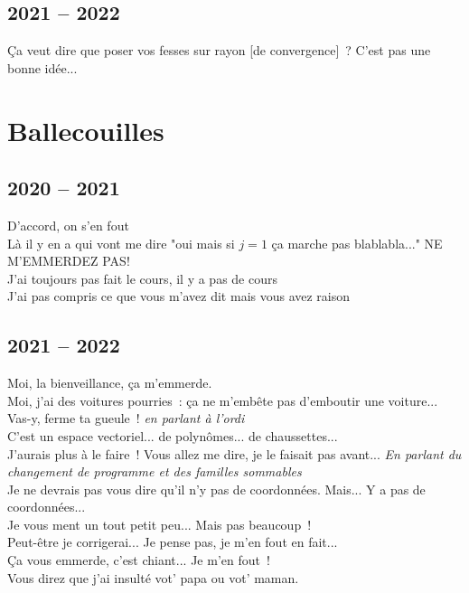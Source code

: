 \documentclass[french, a4paper, openany]{book}
\begin{document}
	\subsection*{2021 -- 2022}
		\noindent \og Ça veut dire que poser vos fesses sur rayon [de convergence]~? C'est pas une bonne idée... \fg \\
 
\section*{Ballecouilles}

	\subsection*{2020 -- 2021}
 
		\noindent \og D'accord, on s'en fout \fg \\
		\og Là il y en a qui vont me dire "oui mais si $j = 1$ ça marche pas blablabla..." NE M'EMMERDEZ PAS! \fg \\
		\og J'ai toujours pas fait le cours, il y a pas de cours \fg \\
		\og J'ai pas compris ce que vous m'avez dit mais vous avez raison \fg \\

	\subsection*{2021 -- 2022}
		\noindent \og Moi, la bienveillance, ça m'emmerde. \fg \\
		\og Moi, j'ai des voitures pourries~: ça ne m'embête pas d'emboutir une voiture... \fg \\
		\og Vas-y, ferme ta gueule~! \fg \emph{en parlant à l'ordi} \\
		\og C'est un espace vectoriel... de polynômes... de chaussettes... \fg \\
		\og J'aurais plus à le faire~! Vous allez me dire, je le faisait pas avant... \fg \emph{En parlant du changement de programme et des familles sommables} \\
		\og Je ne devrais pas vous dire qu'il n'y pas de coordonnées. Mais... Y a pas de coordonnées... \fg \\
		\og Je vous ment un tout petit peu... Mais pas beaucoup~! \fg \\
		\og Peut-être je corrigerai... Je pense pas, je m'en fout en fait... \fg \\
		\og Ça vous emmerde, c'est chiant... Je m'en fout~! \fg \\
		\og Vous direz que j'ai insulté vot' papa ou vot' maman. \fg \\
\end{document}

